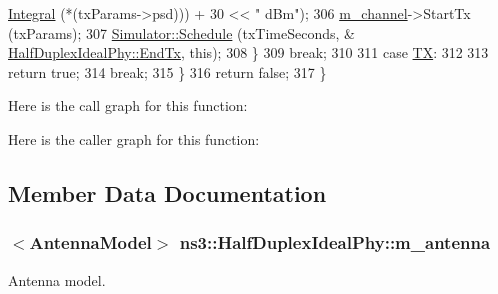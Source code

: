 \begin{DoxyCode}
      \hyperlink{namespacens3_a3dd3817567502f8bc77b04e47134c070}{Integral} (*(txParams->psd))) + 30 << \textcolor{stringliteral}{" dBm"});
306         \hyperlink{classns3_1_1HalfDuplexIdealPhy_a9bb6049f9f9ff30db2f243eef2fe78d8}{m\_channel}->StartTx (txParams);
307         \hyperlink{classns3_1_1Simulator_a671882c894a08af4a5e91181bf1eec13}{Simulator::Schedule} (txTimeSeconds, &
      \hyperlink{classns3_1_1HalfDuplexIdealPhy_abf572203288ca08774135c02691215a8}{HalfDuplexIdealPhy::EndTx}, \textcolor{keyword}{this});
308       \}
309       \textcolor{keywordflow}{break};
310 
311     \textcolor{keywordflow}{case} \hyperlink{classns3_1_1HalfDuplexIdealPhy_acc684e2a6ce03ae8ff429ce480f61c3aa6e02b7c513143f623f71938508be304e}{TX}:
312 
313       \textcolor{keywordflow}{return} \textcolor{keyword}{true};
314       \textcolor{keywordflow}{break};
315     \}
316   \textcolor{keywordflow}{return} \textcolor{keyword}{false};
317 \}
\end{DoxyCode}


Here is the call graph for this function\+:




Here is the caller graph for this function\+:




\subsection{Member Data Documentation}
\subsubsection[{\texorpdfstring{m\+\_\+antenna}{m_antenna}}]{$<${\bf Antenna\+Model}$>$ ns3\+::\+Half\+Duplex\+Ideal\+Phy\+::m\+\_\+antenna\hspace{0.3cm}{\ttfamily [private]}}\hypertarget{classns3_1_1HalfDuplexIdealPhy_a4f2f0f4e0c74e5dadd3dd775768e5195}{}\label{classns3_1_1HalfDuplexIdealPhy_a4f2f0f4e0c74e5dadd3dd775768e5195}


Antenna model. 

